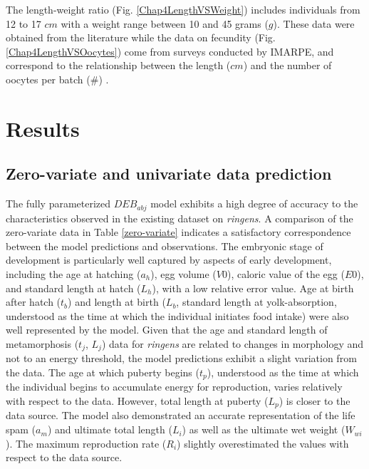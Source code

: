 The length-weight ratio (Fig. \ref{Chap4LengthVSWeight}) includes individuals from 12 to 17 $cm$ with a weight range between 10 and 45 grams ($g$). These data were obtained from the literature \citep{Mina1968} while the data on fecundity (Fig. \ref{Chap4LengthVSOocytes}) come from surveys conducted by IMARPE, and correspond to the relationship between the length ($cm$) and the number of oocytes per batch ($\#$) \citep{PereBuit2000}.

\clearpage
\section{Results}

\subsection{Zero-variate and univariate data prediction}

The fully parameterized $DEB_{abj}$ model exhibits a high degree of accuracy to the characteristics observed in the existing dataset on \textit{\gls{ringens}}. A comparison of the zero-variate data in Table \ref{zero-variate} indicates a satisfactory correspondence between the model predictions and observations. The embryonic stage of development is particularly well captured by aspects of early development, including the age at hatching ($a_{h}$), egg volume ($V0$), caloric value of the egg ($E0$), and standard length at hatch ($L_{h}$), with a low relative error value. Age at birth after hatch ($t_{b}$) and length at birth ($L_{b}$, standard length at yolk-absorption, understood as the time at which the individual initiates food intake) were also well represented by the model. Given that the age and standard length of metamorphosis ($t_{j}$, $L_{j}$) data for \textit{\gls{ringens}} are related to changes in morphology and not to an energy threshold, the model predictions exhibit a slight variation from the data. The age at which puberty begins ($t_{p}$), understood as the time at which the individual begins to accumulate energy for reproduction, varies relatively with respect to the data. However, total length at puberty ($L_{p}$) is closer to the data source. The model also demonstrated an accurate representation of the life spam ($a_{m}$) and ultimate total length ($L_{i}$) as well as the ultimate wet weight ($W_{wi}$). The maximum reproduction rate ($R_{i}$) slightly overestimated the values with respect to the data source.\\

